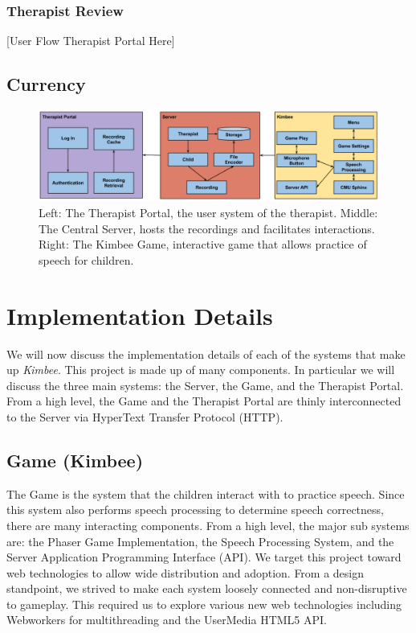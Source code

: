 \documentclass{sig-alternate-2013}
\begin{document}
\subsubsection{Therapist Review}

[User Flow Therapist Portal Here]

\subsection{Currency}

\begin{figure}[t]
  \centering
  \includegraphics[keepaspectratio, width=\textwidth]{tech_figure.png}
  \vspace{-23 pt}
  \caption{\normalfont Left: The Therapist Portal, the user system of the therapist. Middle: The Central Server, hosts the recordings and facilitates interactions. Right: The Kimbee Game, interactive game that allows practice of speech for children. }
  \label{fig:tech}
\end{figure}

\section{Implementation Details}

We will now discuss the implementation details of each of the systems that make up {\em Kimbee}. This project is made up of many components. In particular we will discuss the three main systems: the Server, the Game, and the Therapist Portal. From a high level, the Game and the Therapist Portal are thinly interconnected to the Server via HyperText Transfer Protocol (HTTP).

\subsection{Game ({\secit Kimbee})}

The Game is the system that the children interact with to practice speech. Since this system also performs speech processing to determine speech correctness, there are many interacting components. From a high level, the major sub systems are: the Phaser Game Implementation, the Speech Processing System, and the Server Application Programming Interface (API). We target this project toward web technologies to allow wide distribution and adoption. From a design standpoint, we strived to make each system loosely connected and non-disruptive to gameplay. This required us to explore various new web technologies including Webworkers for multithreading and the UserMedia HTML5 API.
\end{document}
